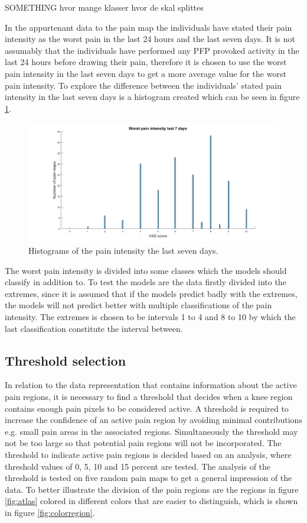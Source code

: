 \noindent
SOMETHING
hvor mange klasser
hvor de skal splittes 


In the appurtenant data to the pain map the individuals have stated their pain intensity as the worst pain in the last 24 hours and the last seven days. 
It is not assumably that the individuals have performed any PFP provoked activity in the last 24 hours before drawing their pain, therefore it is chosen to use the worst pain intensity in the last seven days to get a more average value for the worst pain intensity. 
To explore the difference between the individuals’ stated pain intensity in the last seven days is a histogram created which can be seen in figure \ref{fig:histopain}.

\begin{figure} [H]
\centering
\includegraphics[width=1\textwidth]{figures/histrogramPain}
\caption{Histograms of the pain intensity the last seven days.}
\label{fig:histopain}
\end{figure}

\noindent
The worst pain intensity is divided into some classes which the models should classify in addition to. To test the models are the data firstly divided into the extremes, since it is assumed that if the models predict badly with the extremes, the models will not predict better with multiple classifications of the pain intensity. The extremes is chosen to be intervals 1 to 4 and 8 to 10 by which the last classification constitute the interval between. 


\subsection{Threshold selection}\label{sec:Selectthreshold}
In relation to the data representation that contains information about the active pain regions, it is necessary to find a threshold that decides when a knee region contains enough pain pixels to be considered active. A threshold is required to increase the confidence of an active pain region by avoiding minimal contributions e.g. small pain areas in the associated regions. Simultaneously the threshold may not be too large so that potential pain regions will not be incorporated. The threshold to indicate active pain regions is decided based on an analysis, where threshold values of 0, 5, 10 and 15 percent are tested. The analysis of the threshold is tested on five random pain maps to get a general impression of the data. To better illustrate the division of the pain regions are the regions in figure \ref{fig:atlas} colored in different colors that are easier to distinguish, which is shown in figure \ref{fig:colorregion}.

